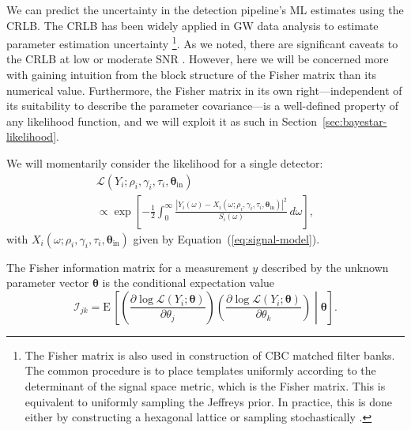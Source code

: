 \documentclass[amsmath,amssymb,aps,prx,reprint,nopreprintnumbers,nofootinbib,showpacs]{revtex4-1}
\begin{document}
We can predict the uncertainty in the detection pipeline's \ac{ML} estimates using the \ac{CRLB}. The \ac{CRLB} has been widely applied in \ac{GW} data analysis to estimate parameter estimation uncertainty \cite{1996PhRvD..53.3033B,FairhurstTriangulation,2009PhRvD..79h4032A,WenLocalizationAdvancedLIGO,LIGOObservingScenarios,FairhurstLIGOIndia}\footnote{\label{footnote:template-banks}The Fisher matrix is also used in construction of \ac{CBC} matched filter banks. The common procedure is to place templates uniformly according to the determinant of the signal space metric, which is the Fisher matrix. This is equivalent to uniformly sampling the Jeffreys prior. In practice, this is done either by constructing a hexagonal lattice \citep{PhysRevD.76.102004} or sampling stochastically \citep{2009PhRvD..80j4014H,2009PhRvD..80b4009V,SBank,2010PhRvD..81b4004M,2014PhRvD..89b4003P}.}. As we noted, there are significant caveats to the \ac{CRLB} at low or moderate \ac{SNR} \cite{BayesianBounds,UseAbuseFisherMatrix,FisherMatrixAsymptoticExpansions,InadequaciesFisherMatrix}. However, here we will be concerned more with gaining intuition from the block structure of the Fisher matrix than its numerical value. Furthermore, the Fisher matrix in its own right---independent of its suitability to describe the parameter covariance---is a well\nobreakdashes-defined property of any likelihood function, and we will exploit it as such in Section~\ref{sec:bayestar-likelihood}.

We will momentarily consider the likelihood for a single detector:
%
\begin{multline}\label{eq:gaussian-likelihood-spa}
    \mathcal{L}\left(Y_i; \rho_i, \gamma_i, \tau_i,
        \bm\theta_\mathrm{in}\right)
    \\
    \propto \exp \left[
        - \frac{1}{2} \int_0^\infty \frac{\left|Y_i (\omega)
            - X_i\left(\omega; \rho_i, \gamma_i, \tau_i,
                \bm\theta_\mathrm{in}\right)
        \right|^2}{S_i(\omega)} \, d\omega
    \right],
\end{multline}
%
with $X_i(\omega; \rho_i, \gamma_i, \tau_i, \bm\theta_\mathrm{in})$ given by Equation~(\ref{eq:signal-model}).

The Fisher information matrix for a measurement $y$ described by the unknown parameter vector $\bm{\theta}$ is the conditional expectation value
%
\begin{equation}\label{eq:general-fisher-matrix}
    \mathcal{I}_{jk} = \mathrm{E} \, \left[
        \left(\frac{\partial \log
            \mathcal{L}(Y_i ; \bm\theta)}
            {\partial \theta_j}\right)
        \left(\frac{\partial \log
            \mathcal{L}(Y_i ; \bm\theta)}
            {\partial \theta_k}\right)
    \middle| \bm\theta
    \right].
\end{equation}
\end{document}
